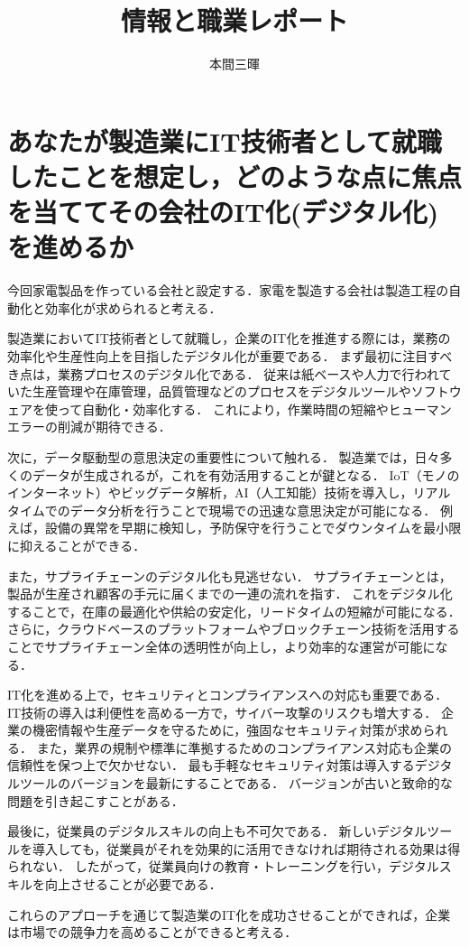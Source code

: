 \documentclass[titlepage,a4paper]{jsarticle}
\title{情報と職業レポート}
\author{本間三暉}
\begin{document}
\maketitle
\section*{あなたが製造業にIT技術者として就職したことを想定し，どのような点に焦点を当ててその会社のIT化(デジタル化)を進めるか}
%
今回家電製品を作っている会社と設定する．家電を製造する会社は製造工程の自動化と効率化が求められると考える．

製造業においてIT技術者として就職し，企業のIT化を推進する際には，業務の効率化や生産性向上を目指したデジタル化が重要である．
まず最初に注目すべき点は，業務プロセスのデジタル化である．
従来は紙ベースや人力で行われていた生産管理や在庫管理，品質管理などのプロセスをデジタルツールやソフトウェアを使って自動化・効率化する．
これにより，作業時間の短縮やヒューマンエラーの削減が期待できる．

次に，データ駆動型の意思決定の重要性について触れる．
製造業では，日々多くのデータが生成されるが，これを有効活用することが鍵となる．
IoT（モノのインターネット）やビッグデータ解析，AI（人工知能）技術を導入し，リアルタイムでのデータ分析を行うことで現場での迅速な意思決定が可能になる．
例えば，設備の異常を早期に検知し，予防保守を行うことでダウンタイムを最小限に抑えることができる．

また，サプライチェーンのデジタル化も見逃せない．
サプライチェーンとは，製品が生産され顧客の手元に届くまでの一連の流れを指す．
これをデジタル化することで，在庫の最適化や供給の安定化，リードタイムの短縮が可能になる．
さらに，クラウドベースのプラットフォームやブロックチェーン技術を活用することでサプライチェーン全体の透明性が向上し，より効率的な運営が可能になる．

IT化を進める上で，セキュリティとコンプライアンスへの対応も重要である．
IT技術の導入は利便性を高める一方で，サイバー攻撃のリスクも増大する．
企業の機密情報や生産データを守るために，強固なセキュリティ対策が求められる．
また，業界の規制や標準に準拠するためのコンプライアンス対応も企業の信頼性を保つ上で欠かせない．
最も手軽なセキュリティ対策は導入するデジタルツールのバージョンを最新にすることである．
バージョンが古いと致命的な問題を引き起こすことがある．

最後に，従業員のデジタルスキルの向上も不可欠である．
新しいデジタルツールを導入しても，従業員がそれを効果的に活用できなければ期待される効果は得られない．
したがって，従業員向けの教育・トレーニングを行い，デジタルスキルを向上させることが必要である．

これらのアプローチを通じて製造業のIT化を成功させることができれば，企業は市場での競争力を高めることができると考える．
\end{document}
